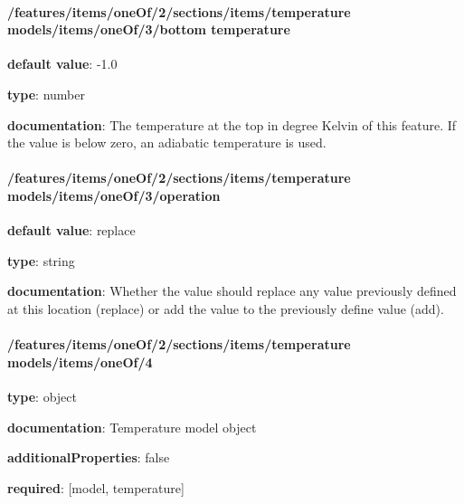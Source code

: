 \begin{itemized}
\end{itemized}\paragraph{/features/items/oneOf/2/sections/items/temperature models/items/oneOf/3/bottom temperature} \begin{itemized}
\item {\bf default value}: -1.0
\item {\bf type}: number
\item {\bf documentation}: The temperature at the top in degree Kelvin of this feature. If the value is below zero, an adiabatic temperature is used.
\end{itemized}\paragraph{/features/items/oneOf/2/sections/items/temperature models/items/oneOf/3/operation} \begin{itemized}
\item {\bf default value}: replace
\item {\bf type}: string
\item {\bf documentation}: Whether the value should replace any value previously defined at this location (replace) or add the value to the previously define value (add).
\end{itemized}\paragraph{/features/items/oneOf/2/sections/items/temperature models/items/oneOf/4} \begin{itemized}
\item {\bf type}: object
\item {\bf documentation}: Temperature model object
\item {\bf additionalProperties}: false
\item {\bf required}: [model, temperature]\end{itemized}

